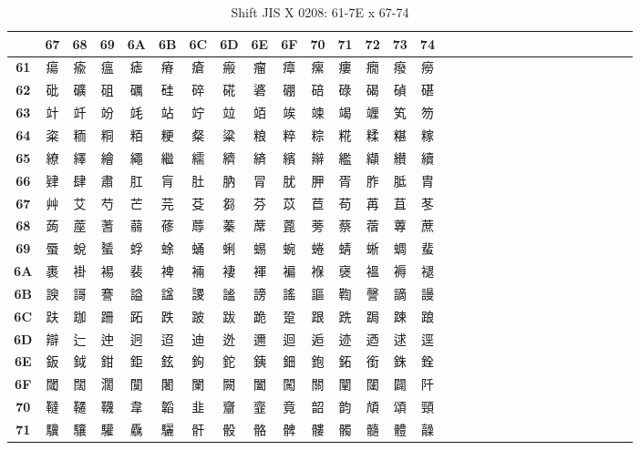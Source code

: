 \begin{table}[H]
\centering
\caption{Shift JIS X 0208: 61-7E x 67-74}
\begin{tabular}{|Sc|Sc|Sc|Sc|Sc|Sc|Sc|Sc|Sc|Sc|Sc|Sc|Sc|Sc|Sc|}
\hline
 & \textbf{67} & \textbf{68} & \textbf{69} & \textbf{6A} & \textbf{6B} & \textbf{6C} & \textbf{6D} & \textbf{6E} & \textbf{6F} & \textbf{70} & \textbf{71} & \textbf{72} & \textbf{73} & \textbf{74} \\ \hline
\textbf{61} & 瘍 & 瘉 & 瘟 & 瘧 & 瘠 & 瘡 & 瘢 & 瘤 & 瘴 & 瘰 & 瘻 & 癇 & 癈 & 癆 \\ \hline
\textbf{62} & 砒 & 礦 & 砠 & 礪 & 硅 & 碎 & 硴 & 碆 & 硼 & 碚 & 碌 & 碣 & 碵 & 碪 \\ \hline
\textbf{63} & 竍 & 竏 & 竕 & 竓 & 站 & 竚 & 竝 & 竡 & 竢 & 竦 & 竭 & 竰 & 笂 & 笏 \\ \hline
\textbf{64} & 粢 & 粫 & 粡 & 粨 & 粳 & 粲 & 粱 & 粮 & 粹 & 粽 & 糀 & 糅 & 糂 & 糘 \\ \hline
\textbf{65} & 繚 & 繹 & 繪 & 繩 & 繼 & 繻 & 纃 & 緕 & 繽 & 辮 & 繿 & 纈 & 纉 & 續 \\ \hline
\textbf{66} & 肄 & 肆 & 肅 & 肛 & 肓 & 肚 & 肭 & 冐 & 肬 & 胛 & 胥 & 胙 & 胝 & 胄 \\ \hline
\textbf{67} & 艸 & 艾 & 芍 & 芒 & 芫 & 芟 & 芻 & 芬 & 苡 & 苣 & 苟 & 苒 & 苴 & 苳 \\ \hline
\textbf{68} & 蒟 & 蓙 & 蓍 & 蒻 & 蓚 & 蓐 & 蓁 & 蓆 & 蓖 & 蒡 & 蔡 & 蓿 & 蓴 & 蔗 \\ \hline
\textbf{69} & 蜃 & 蛻 & 蜑 & 蜉 & 蜍 & 蛹 & 蜊 & 蜴 & 蜿 & 蜷 & 蜻 & 蜥 & 蜩 & 蜚 \\ \hline
\textbf{6A} & 裹 & 褂 & 裼 & 裴 & 裨 & 裲 & 褄 & 褌 & 褊 & 褓 & 襃 & 褞 & 褥 & 褪 \\ \hline
\textbf{6B} & 諛 & 謌 & 謇 & 謚 & 諡 & 謖 & 謐 & 謗 & 謠 & 謳 & 鞫 & 謦 & 謫 & 謾 \\ \hline
\textbf{6C} & 趺 & 跏 & 跚 & 跖 & 跌 & 跛 & 跋 & 跪 & 跫 & 跟 & 跣 & 跼 & 踈 & 踉 \\ \hline
\textbf{6D} & 辯 & 辷 & 迚 & 迥 & 迢 & 迪 & 迯 & 邇 & 迴 & 逅 & 迹 & 迺 & 逑 & 逕 \\ \hline
\textbf{6E} & 鈑 & 鉞 & 鉗 & 鉅 & 鉉 & 鉤 & 鉈 & 銕 & 鈿 & 鉋 & 鉐 & 銜 & 銖 & 銓 \\ \hline
\textbf{6F} & 閾 & 闊 & 濶 & 闃 & 闍 & 闌 & 闕 & 闔 & 闖 & 關 & 闡 & 闥 & 闢 & 阡 \\ \hline
\textbf{70} & 韃 & 韆 & 韈 & 韋 & 韜 & 韭 & 齏 & 韲 & 竟 & 韶 & 韵 & 頏 & 頌 & 頸 \\ \hline
\textbf{71} & 驥 & 驤 & 驩 & 驫 & 驪 & 骭 & 骰 & 骼 & 髀 & 髏 & 髑 & 髓 & 體 & 髞 \\ \hline

\end{tabular}
\end{table}
